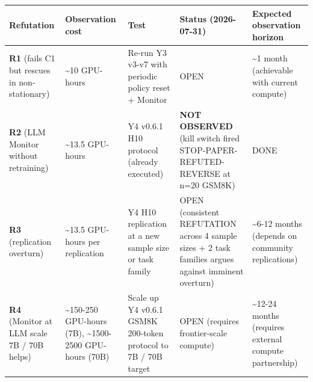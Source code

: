 \documentclass[
]{article}
\newcounter{none} %
\begin{document}
{\def\LTcaptype{none} %
\begin{longtable}[]{@{}
  >{\raggedright\arraybackslash}p{}
  >{\raggedright\arraybackslash}p{}
  >{\raggedright\arraybackslash}p{}
  >{\raggedright\arraybackslash}p{}
  >{\raggedright\arraybackslash}p{}@{}}
\toprule\noalign{}
\begin{minipage}[b]{\linewidth}\raggedright
Refutation
\end{minipage} & \begin{minipage}[b]{\linewidth}\raggedright
Observation cost
\end{minipage} & \begin{minipage}[b]{\linewidth}\raggedright
Test
\end{minipage} & \begin{minipage}[b]{\linewidth}\raggedright
Status (2026-07-31)
\end{minipage} & \begin{minipage}[b]{\linewidth}\raggedright
Expected observation horizon
\end{minipage} \\
\midrule\noalign{}
\endhead
\bottomrule\noalign{}
\endlastfoot
\textbf{R1} (fails C1 but rescues in non-stationary) & \textasciitilde10
GPU-hours & Re-run Y3 v3-v7 with periodic policy reset + Monitor & OPEN
& \textasciitilde1 month (achievable with current compute) \\
\textbf{R2} (LLM Monitor without retraining) & \textasciitilde13.5
GPU-hours & Y4 v0.6.1 H10 protocol (already executed) & \textbf{NOT
OBSERVED} (kill switch fired STOP-PAPER-REFUTED-REVERSE at n=20 GSM8K) &
DONE \\
\textbf{R3} (replication overturn) & \textasciitilde13.5 GPU-hours per
replication & Y4 H10 replication at a new sample size or task family &
OPEN (consistent REFUTATION across 4 sample sizes + 2 task families
argues against imminent overturn) & \textasciitilde6-12 months (depends
on community replications) \\
\textbf{R4} (Monitor at LLM scale 7B / 70B helps) &
\textasciitilde150-250 GPU-hours (7B), \textasciitilde1500-2500
GPU-hours (70B) & Scale up Y4 v0.6.1 GSM8K 200-token protocol to 7B /
70B target & OPEN (requires frontier-scale compute) &
\textasciitilde12-24 months (requires external compute partnership) \\
\end{longtable}
}
\end{document}
